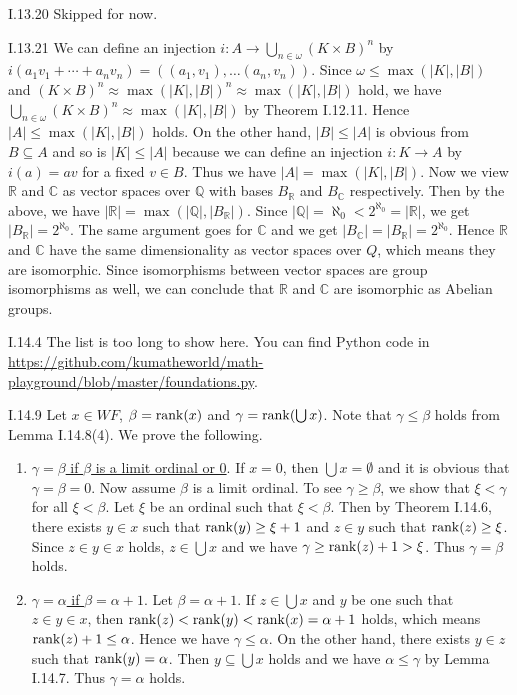 \documentclass[12pt]{article}
\begin{document}
\begin{customthm}{I.13.20}
  Skipped for now.
\end{customthm}

\begin{customthm}{I.13.21}
  We can define an injection $i:A\rightarrow\bigcup_{n\in\omega}(K\times B)^n$ by $i(a_1v_1+\cdots+a_nv_n)=((a_1,v_1),\ldots(a_n,v_n))$. Since $\omega\leq\max(|K|,|B|)$ and $(K\times B)^n\approx\max(|K|,|B|)^n\approx\max(|K|,|B|)$ hold, we have $\bigcup_{n\in\omega}(K\times B)^n\approx\max(|K|,|B|)$ by Theorem I.12.11. Hence $|A|\leq\max(|K|,|B|)$ holds. On the other hand, $|B|\leq|A|$ is obvious from $B\subseteq A$ and so is $|K|\leq|A|$ because we can define an injection $i:K\rightarrow A$ by $i(a)=av$ for a fixed $v\in B$. Thus we have $|A|=\max(|K|,|B|)$. Now we view $\mathbb{R}$ and $\mathbb{C}$ as vector spaces over $\mathbb{Q}$ with bases $B_\mathbb{R}$ and $B_\mathbb{C}$ respectively. Then by the above, we have $|\mathbb{R}|=\max(|\mathbb{Q}|, |B_\mathbb{R}|)$. Since $|\mathbb{Q}|=\aleph_0<2^{\aleph_0}=|\mathbb{R}|$, we get $|B_\mathbb{R}|=2^{\aleph_0}$. The same argument goes for $\mathbb{C}$ and we get $|B_\mathbb{C}|=|B_\mathbb{R}|=2^{\aleph_0}$. Hence $\mathbb{R}$ and $\mathbb{C}$ have the same dimensionality as vector spaces over $Q$, which means they are isomorphic. Since isomorphisms between vector spaces are group isomorphisms as well, we can conclude that $\mathbb{R}$ and $\mathbb{C}$ are isomorphic as Abelian groups.
\end{customthm}

\begin{customthm}{I.14.4}
  The list is too long to show here. You can find Python code in \url{https://github.com/kumatheworld/math-playground/blob/master/foundations.py}.
\end{customthm}

\begin{customthm}{I.14.9}
  Let $x\in WF$,  $\beta=\mathop{\mathrm{rank}}(x)$ and $\gamma=\mathop{\mathrm{rank}}(\bigcup x)$. Note that $\gamma\leq\beta$ holds from Lemma I.14.8(4). We prove the following.
  \begin{enumerate}
    \item\underline{$\gamma=\beta$ if $\beta$ is a limit ordinal or 0}. If $x=0$, then $\bigcup x=\emptyset$ and it is obvious that $\gamma=\beta=0$. Now assume $\beta$ is a limit ordinal. To see $\gamma\geq\beta$, we show that $\xi<\gamma$ for all $\xi<\beta$. Let $\xi$ be an ordinal such that $\xi<\beta$. Then by Theorem I.14.6, there exists $y\in x$ such that $\mathop{\mathrm{rank}}(y)\geq\xi+1$ and $z\in y$ such that $\mathop{\mathrm{rank}}(z)\geq\xi$. Since $z\in y\in x$ holds, $z\in\bigcup x$ and we have $\gamma\geq\mathop{\mathrm{rank}}(z)+1>\xi$. Thus $\gamma=\beta$ holds.
    \item\underline{$\gamma=\alpha$ if $\beta=\alpha+1$}. Let $\beta=\alpha+1$. If $z\in\bigcup x$ and $y$ be one such that $z\in y\in x$, then $\mathop{\mathrm{rank}}(z)<\mathop{\mathrm{rank}}(y)<\mathop{\mathrm{rank}}(x)=\alpha+1$ holds, which means $\mathop{\mathrm{rank}}(z)+1\leq\alpha$. Hence we have $\gamma\leq\alpha$. On the other hand, there exists $y\in z$ such that $\mathop{\mathrm{rank}}(y)=\alpha$. Then $y\subseteq\bigcup x$ holds and we have $\alpha\leq\gamma$ by Lemma I.14.7. Thus $\gamma=\alpha$ holds.
  \end{enumerate}
\end{customthm}
\end{document}
